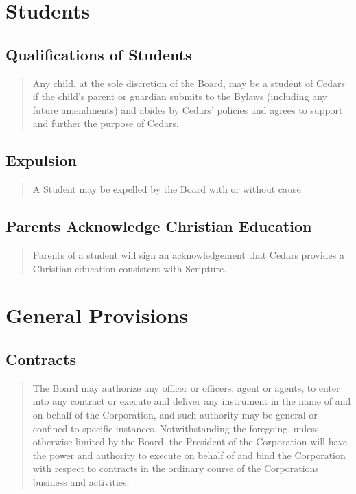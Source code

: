 \documentclass[
]{book}
\begin{document}
\chapter{Students}\label{students}

\section{Qualifications of Students}\label{qualifications-of-students}

\begin{quote}
Any child, at the sole discretion of the Board, may be a student of
Cedars if the child's parent or guardian submits to the Bylaws
(including any future amendments) and abides by Cedars' policies and
agrees to support and further the purpose of Cedars.
\end{quote}

\section{Expulsion}\label{expulsion}

\begin{quote}
A Student may be expelled by the Board with or without cause.
\end{quote}

\section{Parents Acknowledge Christian Education}\label{parents-acknowledge-christian-education}

\begin{quote}
Parents of a student will sign an acknowledgement that Cedars provides
a Christian education consistent with Scripture.
\end{quote}

\chapter{General Provisions}\label{general-provisions}

\section{Contracts}\label{contracts}

\begin{quote}
The Board may authorize any officer or officers, agent or agents, to
enter into any contract or execute and deliver any instrument in the
name of and on behalf of the Corporation, and such authority may be
general or confined to specific instances. Notwithstanding the
foregoing, unless otherwise limited by the Board, the President of the
Corporation will have the power and authority to execute on behalf of
and bind the Corporation with respect to contracts in the ordinary
course of the Corporation\textquotesingle s business and activities.
\end{quote}
\end{document}

